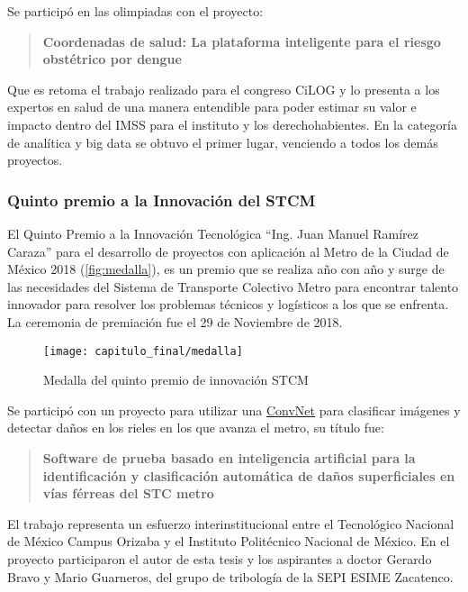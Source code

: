 Se participó en las olimpiadas con el proyecto:

\begin{quotation}
    \textbf{Coordenadas de salud: La plataforma inteligente para el riesgo obstétrico por dengue}
\end{quotation}

Que es retoma el trabajo realizado para el congreso CiLOG y lo presenta a los
expertos en salud de una manera entendible para poder estimar su valor e impacto
dentro del IMSS para el instituto y los derechohabientes. En la categoría de
analítica y big data se obtuvo el primer lugar, venciendo a todos los demás
proyectos.

\subsubsection{Quinto premio a la Innovación del STCM}

El Quinto Premio a la Innovación Tecnológica “Ing. Juan Manuel Ramírez Caraza”
para el desarrollo de proyectos con aplicación al Metro de la Ciudad de México
2018 (\autoref{fig:medalla}), es un premio que se realiza año con año y surge de
las necesidades del Sistema de Transporte Colectivo Metro para encontrar talento
innovador para resolver los problemas técnicos y logísticos a los que se
enfrenta. La ceremonia de premiación fue el 29 de Noviembre de 2018.

\begin{figure}[H]
    \centering
    \texttt{[image: capitulo\_final/medalla]}
    \caption{Medalla del quinto premio de innovación STCM}\label{fig:medalla}
\end{figure}

Se participó con un proyecto para utilizar una \hyperlink{abbr}{ConvNet} para
clasificar imágenes y detectar daños en los rieles en los que avanza el metro,
su título fue: 

\begin{quotation}
\textbf{Software de prueba basado en inteligencia artificial para la
    identificación y clasificación automática de daños superficiales en vías
    férreas del STC metro}
\end{quotation}

El trabajo representa un esfuerzo interinstitucional entre el Tecnológico
Nacional de México Campus Orizaba y el Instituto Politécnico Nacional de México.
En el proyecto participaron el autor de esta tesis y los aspirantes a doctor
Gerardo Bravo y Mario Guarneros, del grupo de tribología de la SEPI ESIME
Zacatenco. 

